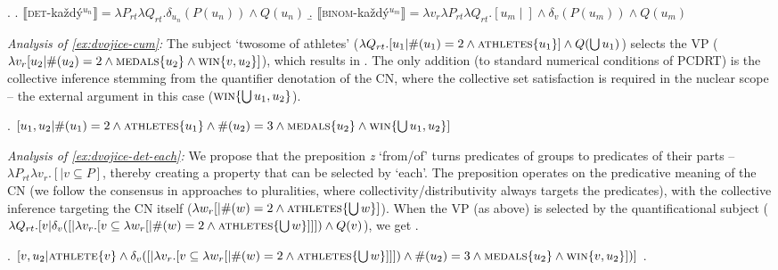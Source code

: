 \documentclass[12pt, a4paper]{scrartcl}
\newcommand{\lb}{\llbracket}
\newcommand{\rb}{\rrbracket}
\newcommand{\sx}[1]{$\lb${#1}$\rb$}
\begin{document}
\ex. \label{def:each}\a. \sx{\textsc{det}-každý$^{u_n}$}${}=\lambda P_{rt}\lambda Q_{rt}.\delta_{u_n}(P(u_n)) \wedge Q(u_n)$\label{def:each-det}
\b. \sx{\textsc{binom}-každý$^{u_m}$}${}=\lambda v_r\lambda P_{rt}\lambda Q_{rt}.[u_m\mid] \wedge \delta_{v}(P(u_m)) \wedge Q(u_m)$\label{def:each-bin}

\textit{Analysis of \ref{ex:dvojice-cum}:} The subject `twosome of athletes' ($\lambda Q_{rt}.[u_1| \#(u_1)=2 \wedge \textsc{athletes}\{u_1\}] \wedge Q(\bigcup u_1)$) selects the VP ($\lambda v_r[u_2 | \#(u_2)=2 \wedge \textsc{medals}\{u_2\} \wedge \textsc{win}\{v,u_2\}]$), which results in \Next. The only addition (to standard numerical conditions of PCDRT) is the collective inference stemming from the quantifier denotation of the CN, where the collective set satisfaction is required in the nuclear scope -- the external argument in this case ($\textsc{win}\{\bigcup u_1,u_2\}$).\vspace{-4pt}

\ex. $[u_1, u_2| \#(u_1)=2\wedge\textsc{athletes}\{u_1\} \wedge \#(u_2)=3 \wedge \textsc{medals}\{u_2\} \wedge \textsc{win}\{\bigcup u_1,u_2\}]$\vspace{-4pt}


 
\textit{Analysis of \ref{ex:dvojice-det-each}:} We propose that the preposition \textit{z} `from/of' turns predicates of groups to predicates of their parts -- $\lambda P_{rt}\lambda v_r.[| v\subseteq P]$, thereby creating a property that can be selected by `each'. The preposition operates on the predicative meaning of the CN (we follow the consensus in approaches to pluralities, where collectivity/distributivity always targets the predicates), with the collective inference targeting the CN itself ($\lambda w_r[|\#(w)=2 \wedge \textsc{athletes}\{\bigcup w\}]$). When the VP (as above) is selected by the quantificational subject ($\lambda Q_{rt}.[v|\delta_{v}([|\lambda v_r.[v \subseteq \lambda w_r[|\#(w)=2 \wedge \textsc{athletes}\{\bigcup w\}]]]) \wedge Q(v)$), we get \Next.%

\ex. $[v,u_2|  \textsc{athlete}\{v\} \wedge \delta_{v}([|\lambda v_r.[v \subseteq \lambda w_r[|\#(w)=2 \wedge \textsc{athletes}\{\bigcup w\}]]]) \wedge \#(u_2)=3 \wedge \textsc{medals}\{u_2\} \wedge \textsc{win}\{v, u_2\}])]$\vspace{-4pt}
\z.
\end{document}
